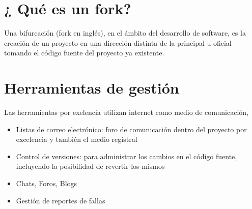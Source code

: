 \section{¿ Qué es un fork?}

Una bifurcación (fork en inglés), en el ámbito del desarrollo de software, es la creación de un proyecto en una dirección distinta de la principal u oficial tomando el código fuente del proyecto ya existente.


\section{Herramientas de gestión}

Las herramientas por exelencia utilizan internet como medio de comunicación,

\begin{itemize}
     \item Listas de correo electrónico: foro de comunicación dentro del proyecto por excelencia y también el medio registral
     \item Control de versiones: para administrar los cambios en el código fuente, incluyendo la posibilidad de revertir los mismos
     \item Chats, Foros, Blogs
     \item Gestión de reportes de fallas
\end{itemize}
